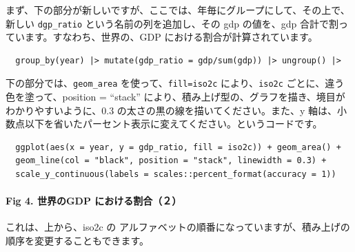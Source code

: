 \documentclass[
  xelatex, ja=standard]{bxjsbook}
\theoremstyle{definition}
\theoremstyle{definition}
\theoremstyle{definition}
\theoremstyle{definition}
\theoremstyle{remark}
\begin{document}
まず、下の部分が新しいですが、ここでは、年毎にグループにして、その上で、新しい \texttt{dgp\_ratio} という名前の列を追加し、その gdp の値を、gdp 合計で割っています。すなわち、世界の、GDP における割合が計算されています。

\begin{verbatim}
  group_by(year) |> mutate(gdp_ratio = gdp/sum(gdp)) |> ungroup() |>
\end{verbatim}

下の部分では、\texttt{geom\_area} を使って、\texttt{fill=iso2c} により、\texttt{iso2c} ごとに、違う色を塗って、position = ``stack'' により、積み上げ型の、グラフを描き、境目がわかりやすいように、0.3 の太さの黒の線を描いてください。また、y 軸は、小数点以下を省いたパーセント表示に変えてください。というコードです。

\begin{verbatim}
  ggplot(aes(x = year, y = gdp_ratio, fill = iso2c)) + geom_area() +
  geom_line(col = "black", position = "stack", linewidth = 0.3) + 
  scale_y_continuous(labels = scales::percent_format(accuracy = 1))
\end{verbatim}

\hypertarget{fig-4.-ux4e16ux754cux306egdp-ux306bux304aux3051ux308bux5272ux5408uxff12-1}{%
\paragraph{Fig 4. 世界のGDP における割合（２）}\label{fig-4.-ux4e16ux754cux306egdp-ux306bux304aux3051ux308bux5272ux5408uxff12-1}}

これは、上から、iso2c の アルファベットの順番になっていますが、積み上げの順序を変更することもできます。
\end{document}
